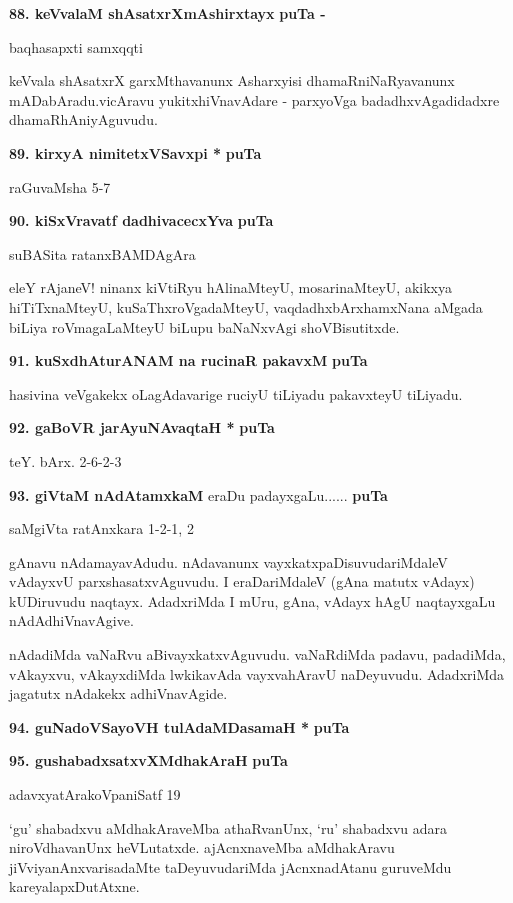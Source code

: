 \medskip
\noindent
\textbf{88. keVvalaM shAsatxrXmAshirxtayx} \hfill{\bf puTa \pageref{64}-\pageref{164}}

\hfill{baqhasapxti samxqqti}

\smallskip
keVvala shAsatxrX garxMthavanunx Asharxyisi dhamaRniNaRyavanunx mADabAradu.\break vicAravu yukitx\-hiVna\-vAdare - parxyoVga badadhxvAgadidadxre dhamaRhAniyAguvudu.


\eject
\noindent
\textbf{89. kirxyA nimitetxVSavxpi *} \hfill{\bf puTa \pageref{56}}

\hfill{raGuvaMsha 5-7}

\medskip
\noindent
\textbf{90. kiSxVravatf dadhivacecxYva} \hfill{\bf puTa \pageref{207}}

\hfill{suBASita ratanxBAMDAgAra}

\smallskip
eleY rAjaneV! ninanx kiVtiRyu hAlinaMteyU, mosarinaMteyU, akikxya hiTiTxnaMteyU, kuSaThx\-roVgadaMteyU, vaqdadhxbArxhamxNana aMgada biLiya roVmagaLaMteyU biLupu baNaNxvAgi shoVBisutitxde.

\medskip
\noindent
\textbf{91. kuSxdhAturANAM na rucinaR pakavxM} \hfill{\bf puTa \pageref{221}}

\smallskip
hasivina veVgakekx oLagAdavarige ruciyU tiLiyadu pakavxteyU tiLiyadu.

\medskip
\noindent
\textbf{92. gaBoVR jarAyuNAvaqtaH *} \hfill{\bf puTa \pageref{87}}

\hfill{teY. bArx. 2-6-2-3}

\medskip
\noindent
\textbf{93. giVtaM nAdAtamxkaM }eraDu padayxgaLu...... \hfill{\bf puTa \pageref{159}}

\hfill{saMgiVta ratAnxkara 1-2-1, 2}

\smallskip
gAnavu nAdamayavAdudu. nAdavanunx vayxkatxpaDisuvudariMdaleV vAdayxvU parxshasatxvAguvudu. I eraDariMdaleV (gAna matutx vAdayx) kUDiruvudu naqtayx. AdadxriMda I mUru, gAna, vAdayx hAgU naqtayxgaLu nAdAdhiVnavAgive.

nAdadiMda vaNaRvu aBivayxkatxvAguvudu. vaNaRdiMda padavu, padadiMda, vAkayxvu, vAkayxdiMda lwkika\-vAda vayxvahAravU naDeyuvudu. AdadxriMda jagatutx nAdakekx adhiVnavAgide.


\medskip
\noindent
\textbf{94. guNadoVSayoVH tulAdaMDasamaH *} \hfill{\bf puTa \pageref{94}}

\medskip
\noindent
\textbf{95. gushabadxsatxvXMdhakAraH} \hfill{\bf puTa \pageref{190}}

\hfill{adavxyatArakoVpaniSatf 19}

\smallskip
`gu' shabadxvu aMdhakAraveMba athaRvanUnx, `ru' shabadxvu adara niroVdhavanUnx heVLutatxde. ajAcnxna\-veMba aMdhakAravu jiVviyanAnxvarisadaMte taDeyuvudariMda jAcnxnadAtanu guruveMdu kareyalapxDu\-tAtxne.

